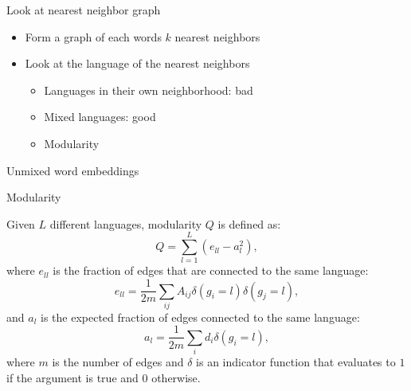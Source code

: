 \documentclass[compress]{beamer}
\newcommand{\fsi}[2]{
\begin{frame}[plain]
\vspace*{-1pt}
\makebox[\linewidth]{\texttt{[image: \#1]}}
\begin{center}
#2
\end{center}
\end{frame}
}
\begin{document}
\begin{frame}{Look at nearest neighbor graph}

  \begin{itemize}
    \item Form a graph of each words $k$ nearest neighbors
    \item Look at the language of the nearest neighbors
      \begin{itemize}
        \item Languages in their own neighborhood: bad
        \item Mixed languages: good
          \pause
        \item Modularity
       \end{itemize}

  \end{itemize}

\end{frame}

\fsi{clwe/uighur_modularity}{Unmixed word embeddings}

\begin{frame}{Modularity}

Given $L$ different languages, modularity $Q$ is defined as:
\begin{equation}
\label{unnorm_modularity}
Q = \sum_{l = 1}^L (e_{ll} - a_l^2),
\end{equation}
where $e_{ll}$ is the fraction of edges that are connected to the same language:
\begin{equation}
e_{ll} = \frac{1}{2m} \sum_{ij} A_{ij} \delta(g_i=l) \delta(g_j=l),
\end{equation}
and $a_{l}$ is the expected fraction of edges connected to the same language:
\begin{equation}
a_{l} = \frac{1}{2m} \sum_{i} d_{i} \delta(g_i=l),
\end{equation}
where $m$ is the number of edges and $\delta$ is an indicator function that evaluates to $1$ if the argument is true and $0$ otherwise.

\end{frame}
\end{document}
